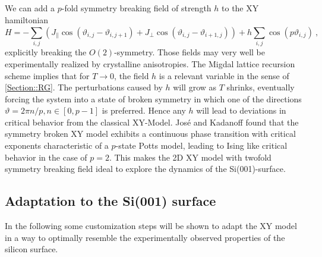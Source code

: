 	We can add a $p$-fold symmetry breaking field of strength $h$ to the XY hamiltonian
	\begin{equation} \label{Eq::XY-Hamilton-Field}
		H =- \sum_{i,j}^{} \left(J_\parallel  \cos \left(\vartheta_{i,j} - \vartheta_{i, j+1} \right) + J_\perp  \cos \left(\vartheta_{i,j} - \vartheta_{i+1, j} \right) \right)	+ h \sum_{i,j} \cos(p\vartheta_{i,j}) ~,
	\end{equation}
	explicitly breaking the $O(2)$-symmetry. Those fields may very well be experimentally realized by crystalline anisotropies. The Migdal lattice recursion scheme \cite{migdal1975phase} implies that for $T \rightarrow 0$, the field $h$ is a relevant variable in the sense of \autoref{Section::RG}. The perturbations caused by $h$ will grow as $T$ shrinks, eventually forcing the system into a state of broken symmetry in which one of the directions $\vartheta =	{2 \pi n }/{p}, n \in \left[0, p-1\right]$ is preferred. Hence any $h$ will lead to deviations in critical behavior from the classical XY-Model. José and Kadanoff \cite{jose1977renormalization} found that the symmetry broken XY model exhibits a continuous phase transition with critical exponents characteristic of a $p$-state Potts model, leading to Ising like critical behavior in the case of $p=2$. This makes the 2D XY model with twofold symmetry breaking field ideal to explore the dynamics of the Si(001)-surface.
	
	\subsection{Adaptation to the Si(001) surface} \label{Sec::XY-to-Silicon}
	In the following some customization steps will be shown to adapt the XY model in a way to optimally resemble the experimentally observed properties of the silicon surface. \\
	
